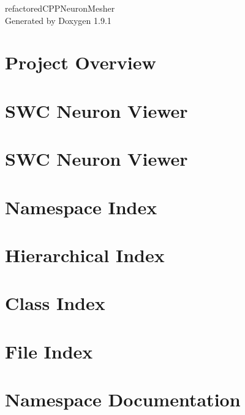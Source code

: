 \let\mypdfximage\pdfximage\def\pdfximage{\immediate\mypdfximage}\documentclass[twoside]{book}
\newcommand{\+}{\discretionary{\mbox{\scriptsize$\hookleftarrow$}}{}{}}
\newcommand{\clearemptydoublepage}{%
  \newpage{\pagestyle{empty}\cleardoublepage}%
}
\begin{document}
\raggedbottom

\hypersetup{pageanchor=false,
             bookmarksnumbered=true,
             pdfencoding=unicode
            }
\begin{titlepage}
\vspace*{7cm}
\begin{center}%
{\Large refactored\+CPPNeuron\+Mesher }\\
\vspace*{1cm}
{\large Generated by Doxygen 1.9.1}\\
\end{center}
\end{titlepage}
\clearemptydoublepage
{}
\tableofcontents
\clearemptydoublepage
{}
\hypersetup{pageanchor=true}

\chapter{Project Overview}
\label{index}\hypertarget{index}{}
\chapter{SWC Neuron Viewer}
\label{md_scripts_app_neuronviewer_README}

\chapter{SWC Neuron Viewer}
\label{md_scripts_README}

\chapter{Namespace Index}

\chapter{Hierarchical Index}

\chapter{Class Index}

\chapter{File Index}

\chapter{Namespace Documentation}










\end{document}
